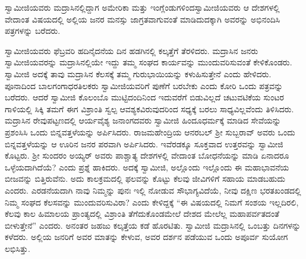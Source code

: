 \vskip 2pt

 ಸ್ವಾಮೀಜಿಯವರು ಮದ್ರಾಸಿನಲ್ಲಿದ್ದಾಗ ಅಮೇರಿಕಾ ಮತ್ತು ಇಂಗ್ಲೆಂಡುಗಳಿಂದ\break ಸ್ವಾಮೀಜಿಯವರು ಆ ದೇಶಗಳಲ್ಲಿ ವೇದಾಂತ ವಿಷಯದಲ್ಲಿ ಅಲ್ಲಿಯ ಜನರ ಮನಸ್ಸು ಜಾಗ್ರತವಾಗುವಂತೆ ಮಾಡಿದುದಕ್ಕಾಗಿ ಅವರನ್ನು ಅಭಿನಂದಿಸಿ ಪತ್ರಗಳನ್ನು ಬರೆದರು. 

\vskip 2pt

 ಸ್ವಾಮೀಜಿಯವರು ಫೆಬ್ರವರಿ ಹದಿನೈದನೆಯ ದಿನ ಹಡಗಿನಲ್ಲಿ ಕಲ್ಕತ್ತೆಗೆ ತೆರಳಿದರು. ಮದ್ರಾಸಿನ ಜನರು ಸ್ವಾಮೀಜಿಯವರನ್ನು ಮದ್ರಾಸಿನಲ್ಲಿಯೇ ಇದ್ದು ತಮ್ಮ ಸಂಘದ ಕಾರ್ಯವನ್ನು ಮುಂದುವರಿಸುವಂತೆ ಕೇಳಿಕೊಂಡರು. ಸ್ವಾಮೀಜಿ ಅದಕ್ಕೆ ತಾವು ಮದ್ರಾಸಿನ ಕೆಲಸಕ್ಕೆ ತಮ್ಮ ಗುರುಭಾಯಿಯನ್ನು ಕಳುಹಿಸುತ್ತೇನೆ ಎಂದು ಹೇಳಿದರು. ಪೂನಾದಿಂದ ಬಾಲಗಂಗಾಧರತಿಲಕರು ಸ್ವಾಮೀಜಿಯವರಿಗೆ ಪುಣೆಗೆ ಬರಬೇಕು ಎಂದು ಕೋರಿ ಒಂದು ಪತ್ರವನ್ನು ಬರೆದರು. ಆದರೆ ಸ್ವಾಮೀಜಿ ಕೊಲಂಬೊ ಮುಟ್ಟಿದಂದಿನಿಂದ ಇದುವರೆಗೆ ಬಿಡುವಿಲ್ಲದೆ ಚಟುವಟಿಕೆಯ ಸುಂಟರ ಗಾಳಿಯಲ್ಲಿ ಸಿಕ್ಕಿ ತಮಗೆ ಈಗ ವಿಶ್ರಾಂತಿ ಸ್ವಲ್ಪ ಆವಶ್ಯಕವಿರುವುದರಿಂದ ಸಧ್ಯಕ್ಕೆ ಬರಲು ಸಾಧ್ಯವಿಲ್ಲವೆಂದು ತಿಳಿಸಿದರು. ಮದ್ರಾಸಿನ ರೇವುಪಟ್ಟಣದಲ್ಲಿ ಆರ್ಯವೈಶ್ಯ ಜನಾಂಗದವರು ಸ್ವಾಮೀಜಿ ಹಿಂದೂಧರ್ಮಕ್ಕೆ ಮಾಡಿದ ಸೇವೆಯನ್ನು ಪ್ರಶಂಸಿಸಿ ಒಂದು ಬಿನ್ನವತ್ತಳೆಯನ್ನು ಅರ್ಪಿಸಿದರು. ರಾಜಮಹೇಂದ್ರಿಯ ಆನರಬಲ್ ಶ‍್ರೀ ಸುಬ್ಬರಾವ್ ಅವರು ಒಂದು ಬಿನ್ನವತ್ತಳೆಯನ್ನು ಆ ಊರಿನ ಜನರ ಪರವಾಗಿ ಅರ್ಪಿಸಿದರು. ಇವೆರಡಕ್ಕೂ ಸೂಕ್ತವಾದ ಉತ್ತರವನ್ನು ಸ್ವಾಮೀಜಿ ಕೊಟ್ಟರು. ಶ‍್ರೀ ಸುಂದರಂ ಅಯ್ಯರ್ ಅವರು ಪಾಶ್ಚಾತ್ಯ ದೇಶಗಳಲ್ಲಿ ವೇದಾಂತ ಬೋಧನೆಯನ್ನು ಮಾಡಿ ಏನಾದರೂ ಒಳ್ಳೆಯದಾಗಿದೆಯೆ? ಎಂದು ಪ್ರಶ್ನೆ ಹಾಕಿದರು. ಅದಕ್ಕೆ ಸ್ವಾಮೀಜಿ, ಅಲ್ಲೊಂದು ಇಲ್ಲೊಂದು ಈ ಮಹಾಭಾವನೆಯ ಬೀಜವನ್ನು ಬಿತ್ತಿರುವೆನು. ಅದು ಕಾಲಕ್ರಮದಲ್ಲಿ ಫಲವನ್ನು ಕೊಟ್ಟು ಕೆಲವು ಜೀವಿಗಳಿಗೆ ಸಹಾಯ ಮಾಡಬಹುದು ಎಂದರು. ಎರಡನೆಯದಾಗಿ ನಾವು ನಿಮ್ಮನ್ನು ಪುನಃ ಇಲ್ಲಿ ನೋಡುವ ಸೌಭಾಗ್ಯವಿದೆಯೆ, ನೀವು ದಕ್ಷಿಣ ಭರತಖಂಡದಲ್ಲಿ ನಿಮ್ಮ ಸಂಘದ ಕೆಲಸವನ್ನು ಮುಂದುವರಿಸುವಿರಾ? ಎಂದು ಕೇಳಿದ್ದಕ್ಕೆ “ಈ ವಿಷಯದಲ್ಲಿ ನಿಮಗೆ ಸಂಶಯ ಇಲ್ಲದಿರಲಿ, ಕೆಲವು ಕಾಲ ಹಿಮಾಲಯ ಪ್ರಾಂತ್ಯದಲ್ಲಿ ವಿಶ್ರಾಂತಿ ತೆಗೆದುಕೊಂಡಮೇಲೆ ದೇಶದ ಮೇಲೆಲ್ಲ ಮಹಾಪರ್ವತದಂತೆ ಬೀಳುತ್ತೇನೆ” ಎಂದರು. ಅನಂತರ ಜಹಜು ಕಲ್ಕತ್ತೆಯ ಕಡೆ ಹೊರಟಿತು. ಸ್ವಾಮೀಜಿ ಮದ್ರಾಸಿನಲ್ಲಿ ಒಂಬತ್ತು ದಿನಗಳನ್ನು ಕಳೆದರು. ಅಲ್ಲಿಯ ಜನರಿಗೆ ಅವರ ಮಾತನ್ನು ಕೇಳುವ, ಅವರ ದರ್ಶನ ಪಡೆಯುವ ಒಂದು ಅಪೂರ್ವ ಸುಯೋಗ ಲಭಿಸಿತ್ತು. 

